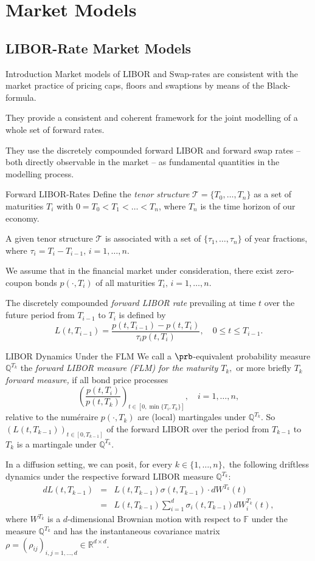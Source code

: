 \section{Market Models}
\subsection{LIBOR-Rate Market Models}

Introduction
	Market models of LIBOR and Swap-rates are consistent
	with the market practice of pricing caps,
	floors and swaptions by means of the Black-formula.
	
	They provide a consistent and coherent framework for the
	joint modelling of a whole set of forward rates.
	
	They use the discretely
	compounded forward LIBOR and forward swap rates -- both directly
	observable in the market -- as fundamental quantities in the
	modelling process.


Forward LIBOR-Rates
	Define the {\em tenor structure} $\mathcal T=\{T_0,
	\dots, T_n\}$ as a set of maturities $T_i$ with
	$0=T_0<T_1<\dots<T_n$, where $T_n$ is the time horizon of our
	economy.
	
	A given tenor structure $\mathcal T$ is associated with a
	set of $\{\tau_1,\dots,\tau_n\}$ of year fractions, where
	$\tau_i=T_i-T_{i-1}, \, i=1,\dots,n.$
	
	We assume that in the
	financial market under consideration, there exist zero-coupon
	bonds  $p(\cdot,T_i)$ of all maturities $T_i,\, i=1,\dots,n$.
	
	The discretely compounded {\em forward LIBOR rate} prevailing at time
	$t$ over the future period from $T_{i-1}$ to $T_i$ is defined by
		$$
		L(t,T_{i-1})=\frac{ p(t,T_{i-1})-p(t,T_i) }{\tau_i p(t,T_i)},
		\quad 0 \leq t \leq T_{i-1}.
		$$


LIBOR Dynamics Under the FLM
	We call a $\prb$-equivalent probability
	measure $\mathbb Q^{T_k}$ the {\it forward LIBOR measure (FLM) for the
	maturity $T_k,$} or more briefly {\it $T_k$ forward measure,} if
	all bond price processes
		$$
		\left( \frac{ p(t,T_i) }{ p(t,T_k) } \right)_{t \in
		[0,\min\{T_i,T_k\}]}, \quad i=1,\hdots,n,
		$$
	relative to the num\'eraire $p(\cdot,T_k)$ are (local) martingales under $\mathbb Q^{T_k}$.
	So  $(L(t,T_{k-1}))_{t \in
	[0,T_{k-1}]}$ of the forward LIBOR over the period from $T_{k-1}$
	to $T_k$ is a martingale under $\mathbb Q^{T_k}$.

	In a diffusion setting, we can posit, for every $k
	\in \{1,\dots,n\},$ the following driftless dynamics under the
	respective forward LIBOR measure $\mathbb Q^{T_k}$:
		\begin{eqnarray}\label{LIBORSDE}
		dL(t,T_{k-1}) & = & L(t,T_{k-1}) \sigma(t,T_{k-1}) \cdot dW^{T_k}(t) \nonumber \\
		& = & L(t,T_{k-1}) \sum_{i=1}^d \sigma_i(t,T_{k-1}) dW_i^{T_k}(t),
		\end{eqnarray}
	where $W^{T_k}$ is a $d$-dimensional Brownian motion with respect
	to $\mathbb F$ under the measure $\mathbb Q^{T_k}$ and has the
	instantaneous covariance matrix $\rho=(\rho_{ij})_{i,j=1,\hdots,d}
	\in \mathbb R^{d\times d}$.
 
